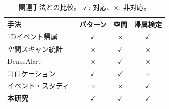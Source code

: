 \begin{table}[t]
\centering
\caption{関連手法との比較。
$\checkmark$: 対応、$\times$: 非対応。}
\label{tab:related}
\small
\begin{tabular}{lccc}
\toprule
手法 & パターン & 空間 & 帰属検定 \\
\midrule
1Dイベント帰属~\cite{dsaa2025}        & $\checkmark$ & $\times$     & $\checkmark$ \\
空間スキャン統計~\cite{kulldorff1997spatial} & $\times$     & $\checkmark$ & $\times$     \\
DenseAlert~\cite{shin2017densealert}  & $\times$     & $\checkmark$ & $\times$     \\
コロケーション~\cite{shekhar2001colocation} & $\checkmark$ & $\checkmark$ & $\times$     \\
イベント・スタディ~\cite{mackinlay1997event} & $\times$     & $\times$     & $\checkmark$ \\
\midrule
\textbf{本研究}                         & $\checkmark$ & $\checkmark$ & $\checkmark$ \\
\bottomrule
\end{tabular}
\end{table}

